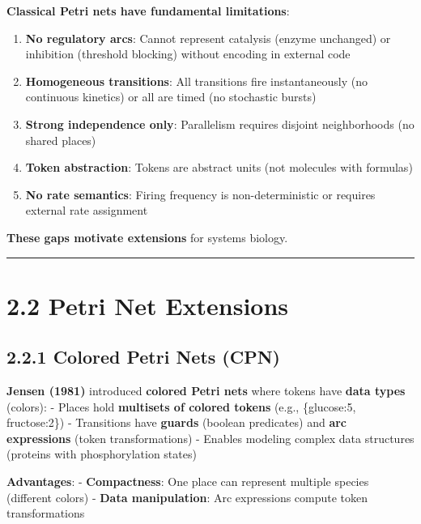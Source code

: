 \textbf{Classical Petri nets have fundamental limitations}:

\begin{enumerate}
\def\labelenumi{\arabic{enumi}.}
\tightlist
\item
  \textbf{No regulatory arcs}: Cannot represent catalysis (enzyme
  unchanged) or inhibition (threshold blocking) without encoding in
  external code
\item
  \textbf{Homogeneous transitions}: All transitions fire instantaneously
  (no continuous kinetics) or all are timed (no stochastic bursts)
\item
  \textbf{Strong independence only}: Parallelism requires disjoint
  neighborhoods (no shared places)
\item
  \textbf{Token abstraction}: Tokens are abstract units (not molecules
  with formulas)
\item
  \textbf{No rate semantics}: Firing frequency is non-deterministic or
  requires external rate assignment
\end{enumerate}

\textbf{These gaps motivate extensions} for systems biology.

\begin{center}\rule{0.5\linewidth}{0.5pt}\end{center}

\hypertarget{petri-net-extensions}{%
\section{2.2 Petri Net Extensions}\label{petri-net-extensions}}

\hypertarget{colored-petri-nets-cpn}{%
\subsection{2.2.1 Colored Petri Nets
(CPN)}\label{colored-petri-nets-cpn}}

\textbf{Jensen (1981)} introduced \textbf{colored Petri nets} where
tokens have \textbf{data types} (colors): - Places hold
\textbf{multisets of colored tokens} (e.g., \{glucose:5, fructose:2\}) -
Transitions have \textbf{guards} (boolean predicates) and \textbf{arc
expressions} (token transformations) - Enables modeling complex data
structures (proteins with phosphorylation states)

\textbf{Advantages}: - \textbf{Compactness}: One place can represent
multiple species (different colors) - \textbf{Data manipulation}: Arc
expressions compute token transformations

